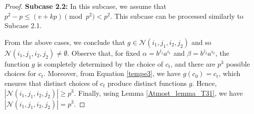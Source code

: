 \documentclass[11pt]{amsart}
\theoremstyle{plain}
\numberwithin{equation}{section}
\begin{document}
\begin{proof}
\textbf{Subcase 2.2:} In this subcase, we assume that $p^2-p \leq (v+kp)\pmod {p^2} <p^2$. This subcase can be processed similarly to Subcase 2.1. 

From the above cases, we conclude that $g \in \mathcal{N}(i_1,j_1,i_2,j_2)$ and so $\mathcal{N}(i_1,j_1,i_2,j_2) \neq \emptyset$. Observe that, for fixed $\alpha = b^{j_1}a^{i_1}$ and $\beta = b^{j_2}a^{i_2}$, the function $g$ is completely determined by the choice of $c_t$, and there are $p^{3}$ possible choices for $c_t$. Moreover, from Equation \eqref{tempe3}, we have $g(c_0)=c_t$, which ensures that distinct choices of $c_t$ produce distinct functions $g$. Hence,
$|\mathcal{N}(i_1,j_1,i_2,j_2)| \ge p^{3}.$
Finally, using Lemma \ref{Atmost_lemma_T31}, we have $|\mathcal{N}(i_1,j_1,i_2,j_2)|=p^3$.
\end{proof}
\end{document}

